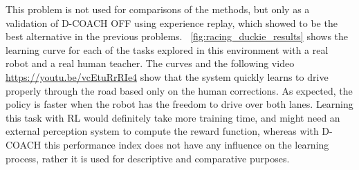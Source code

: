 This problem is not used for comparisons of the methods, but only as a validation of D-COACH OFF using experience replay, which showed to be the best alternative in the previous problems. \figurename~\ref{fig:racing_duckie_results} shows the learning curve for each of the tasks explored in this environment with a real robot and a real human teacher. The curves and the following video \url{https://youtu.be/vcEtuRrRIe4} show that the system quickly learns to drive properly through the road based only on the human corrections. As expected, the policy is faster when the robot has the freedom to drive over both lanes. Learning this task with RL would definitely take more training time, and might need an external perception system to compute the reward function, whereas with D-COACH this performance index does not have any influence on the learning process, rather it is used for descriptive and comparative purposes.

